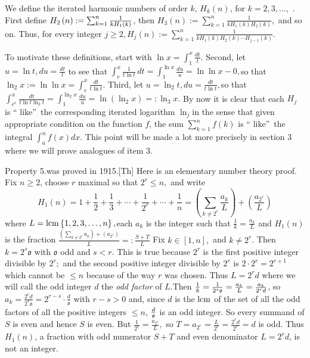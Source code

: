\documentclass{article}
\begin{document}
We define the iterated harmonic numbers of order $k$, $H_{k}(n)$, for $%
k=2,3,\dots ,$ . First define $H_{2}\left( n\right) :=\sum_{k=1}^{n}\frac{1}{%
kH_{1}\left( k\right) }$, then $H_{3}\left( n\right) :=\sum_{k=1}^{n}\frac{1%
}{kH_{1}\left( k\right) H_{2}\left( k\right) },$ and so on. Thus, for every
integer $j\geq 2,H_{j}\left( n\right) :=\sum_{k=1}^{n}\frac{1}{kH_{1}\left(
k\right) H_{2}\left( k\right) \cdots H_{j-1}\left( k\right) }$.

To motivate these definitions, start with $\ln x=\int_{1}^{x}\frac{dt}{t}.$%
Second, let $u=\ln t,du=\frac{dt}{t}$ to see that $\allowbreak \int_{e}^{x}%
\frac{1}{t\ln t}\,dt=\int_{1}^{\ln x}\frac{du}{u}=\ln \ln x-0,$so that $\ln
_{2}x:=\ln \ln x=\int_{e}^{x}\frac{dt}{t\ln t}$. Third, let $u=\ln _{2}t,du=%
\frac{dt}{t\ln t},$so that $\int_{e^{e}}^{x}\frac{dt}{t\ln t\ln _{2}t}%
=\int_{1}^{\ln _{2}x}\frac{du}{u}=\ln \left( \ln _{2}x\right) =:\ln _{3}x.$
By now it is clear that each $H_{j}$ is \textquotedblleft
like\textquotedblright\ the corresponding iterated logarithm $\ln _{j}$in
the sense that given appropriate condition on the function $f$, the sum $%
\sum_{k=1}^{n}f\left( k\right) $ is \textquotedblleft
like\textquotedblright\ the integral $\int_{a}^{n}f\left( x\right) dx.$ This
point will be made a lot more precisely in section 3 where we will prove
analogues of item 3.

Property 5.was proved in 1915.[Th] Here is an elementary number theory
proof. Fix $n\geq 2$, choose $r$ maximal so that $2^{r}\leq n,$ and write 
\[
H_{1}\left( n\right) =1+\frac{1}{2}+\frac{1}{3}+\cdots +\frac{1}{2^{r}}%
+\cdots +\frac{1}{n}=\left( \sum_{k\neq 2^{r}}\frac{a_{k}}{L}\right) +\left( 
\frac{a_{2^{r}}}{L}\right) 
\]%
where $L=\mathop{\rm lcm}\left\{ 1,2,3,\dots ,n\right\} ,$each $a_{k}$ is the
integer such that $\frac{1}{k}=\frac{a_{k}}{L}$ and $H_{1}\left( n\right) $
is the fraction $\frac{\left( \sum_{k\neq 2^{r}}a_{k}\right) +\left(
a_{2^{r}}\right) }{L}=:\frac{S+T}{L}$ Fix $k\in \left[ 1,n\right] ,$ and $%
k\neq 2^{r}$. Then $k=2^{s}\mathfrak{o}$ with $\mathfrak{o}$ odd and $s<r.$
This is true because $2^{r}$ is the first positive integer divisible by $%
2^{r};$ and the second positive integer divisible by $2^{r}$ is $2\cdot
2^{r}=2^{r+1}$ which cannot be $\leq n$ because of the way $r$ was chosen.
Thus $L=2^{r}d$ where we will call the odd integer $d$ the \textit{odd factor%
} of $L.$Then $\frac{1}{k}=\frac{1}{2^{s}\mathfrak{o}}=\frac{a_{k}}{L}=\frac{%
a_{k}}{2^{r}d}$, so $a_{k}=\frac{2^{r}d}{2^{s}\mathfrak{o}}=2^{r-s}\cdot 
\frac{d}{\mathfrak{o}}$ with $r-s>0$ and, since $d$ is the $\mathop{\rm lcm}\ $of
the set of all the odd factors of all the positive integers $\leq n$, $\frac{%
d}{\mathfrak{o}}$ is an odd integer. So every summand of $S$ is even and
hence $S$ is even. But $\frac{1}{2^{r}}=\frac{a_{2^{r}}}{L},$ so $%
T=a_{2^{r}}=\frac{L}{2^{r}}=\frac{2^{r}d}{2^{r}}=d$ is odd. Thus $%
H_{1}\left( n\right) $, a fraction with odd numerator $S+T$ and even
denominator $L=2^{r}d$, is not an integer.
\end{document}
